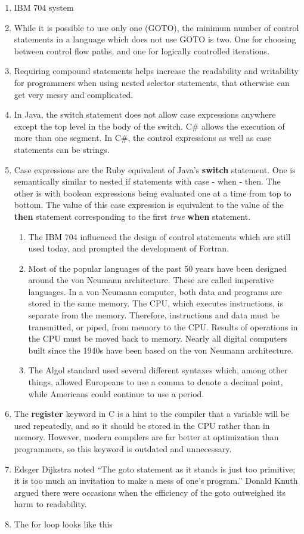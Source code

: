   \begin{enumerate}
\item IBM 704 system
\item While it is possible to use only one (GOTO), the minimum number
  of control statements in a language which does not use GOTO is
  two. One for choosing between control flow paths, and one for
  logically controlled iterations.
\item Requiring compound statements helps increase the readability and
  writability for programmers when using nested selector statements,
  that otherwise can get very messy and complicated.
\item In Java, the switch statement does not allow case expressions
  anywhere except the top level in the body of the switch.  C\# allows
  the execution of more than one segment. In C\#, the control
  expressions as well as case statements can be strings.
\item Case expressions are the Ruby equivalent of Java's
  \textbf{switch} statement. One is semantically similar to nested if
  statements with case - when - then. The other is with boolean
  expressions being evaluated one at a time from top to bottom. The
  value of this case expression is equivalent to the value of the
  \textbf{then} statement corresponding to the first \textit{true}
  \textbf{when} statement.
\begin{enumerate}
\item The IBM 704 influenced the design of control statements which
  are still used today, and prompted the development of Fortran.
\item Most of the popular languages of the past 50 years have been
  designed around the von Neumann architecture. These are called
  imperative languages. In a von Neumann computer, both data and
  programs are stored in the same memory. The CPU, which executes
  instructions, is separate from the memory. Therefore, instructions
  and data must be transmitted, or piped, from memory to the
  CPU. Results of operations in the CPU must be moved back to
  memory. Nearly all digital computers built since the 1940s have been
  based on the von Neumann architecture.
\item The Algol standard used several different syntaxes which, among
  other things, allowed Europeans to use a comma to denote a decimal
  point, while Americans could continue to use a period.
\end{enumerate}
\item The \textbf{register} keyword in C is a hint to the compiler
  that a variable will be used repeatedly, and so it should be stored
  in the CPU rather than in memory. However, modern compilers are far
  better at optimization than programmers, so this keyword is outdated
  and unnecessary.
\item Edsger Dijkstra noted “The goto statement as it stands is just
  too primitive; it is too much an invitation to make a mess of one’s
  program.” Donald Knuth argued there were occasions when the
  efficiency of the goto outweighed its harm to readability.
\item The for loop looks like this


\end{enumerate}
